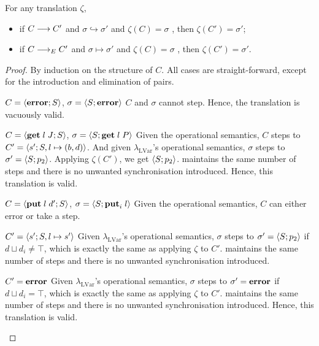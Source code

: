 \documentclass[main.tex]{subfiles}
\begin{document}
\begin{lemma}
  For any translation $\zeta$,
  \begin{itemize}
    \item if $C \longrightarrow C'$ and $\sigma \hookrightarrow \sigma'$ and $\zeta(C) =
      \sigma$ , then $\zeta(C') = \sigma'$;
    \item if $C \longrightarrow_{E} C'$ and $\sigma \mapsto \sigma'$ and $\zeta(C) =
      \sigma$ , then $\zeta(C') = \sigma'$.
  \end{itemize}
\end{lemma}

\begin{proof}
  By induction on the structure of $C$. All cases are straight-forward, except
  for the introduction and elimination of pairs.

  \begin{case}{%
      $C = \langle {\ensuremath{\mathbf{error}}}; {S} \rangle$,
      $\sigma = \langle {S}; {\mathbf{error}} \rangle$}
    $C$ and $\sigma$ cannot step. Hence, the translation is vacuously valid.
  \end{case}

  \begin{case}{%
      $C = \langle {\ensuremath{\mathbf{get}}\;l\;J}; {S} \rangle$,
      $\sigma = \langle {S}; {\mathbf{get}\;l\;P} \rangle$}
    Given the operational semantics, $C$ steps to $C' = \langle {s'}; {S, l \mapsto (b, d)} \rangle$. And given $\lambda_{\text{LVar}}$'s operational semantics, $\sigma$ steps to $\sigma' = \langle {S}; {p_2} \rangle$. Applying $\zeta (C')$, we get $\langle {S}; {p_2} \rangle$. \typedlambdalvar maintains the same number of steps and there is no unwanted synchronisation introduced. Hence, this translation is valid.
  \end{case}

  \begin{case}{%
      $C = \langle {\ensuremath{\mathbf{put}}\;l\;d'}; {S} \rangle$,
      $\sigma = \langle {S}; {\mathbf{put}_{i}\;l} \rangle$}
    Given the operational semantics, $C$ can either error or take a step.
    \begin{subcase}{$C' = \langle {s'}; {S, l \mapsto s'} \rangle$}
      Given $\lambda_{\text{LVar}}$'s operational semantics, $\sigma$ steps to $\sigma' = \langle {S}; {p_2} \rangle$ if $d \sqcup d_{i} \neq \top$, which is exactly the same as applying $\zeta$ to $C'$. \typedlambdalvar maintains the same number of steps and there is no unwanted synchronisation introduced.
    \end{subcase}
    \begin{subcase}{$C' = \mathbf{error}$}
      Given $\lambda_{\text{LVar}}$'s operational semantics, $\sigma$ steps to $\sigma' = \mathbf{error}$ if $d \sqcup d_{i} = \top$, which is exactly the same as applying $\zeta$ to $C'$. \typedlambdalvar maintains the same number of steps and there is no unwanted synchronisation introduced. Hence, this translation is valid.
    \end{subcase}
  \end{case}


\end{proof}
\end{document}
